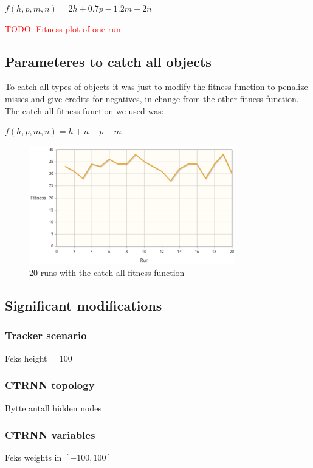 \begin{center}
$f(h,p,m,n) = 2h + 0.7p - 1.2m - 2n$
\end{center}

\textcolor{red}{TODO: Fitness plot of one run}

\subsection{Parameteres to catch all objects}
To catch all types of objects it was just to modify the fitness function to penalize misses and give credits for negatives, in change from the other fitness function. The catch all fitness function we used was:

\begin{center}
$f(h,p,m,n) = h + n + p - m$
\end{center}


\begin{figure}[h]
  \centering
    \includegraphics[width=0.8\textwidth]{img/catch_all}
    \caption{20 runs with the catch all fitness function}
\end{figure}


\subsection{Significant modifications}
\subsubsection{Tracker scenario}
Feks height = 100

\subsubsection{CTRNN topology}
Bytte antall hidden nodes

\subsubsection{CTRNN variables}
Feks weights in $[-100, 100]$

